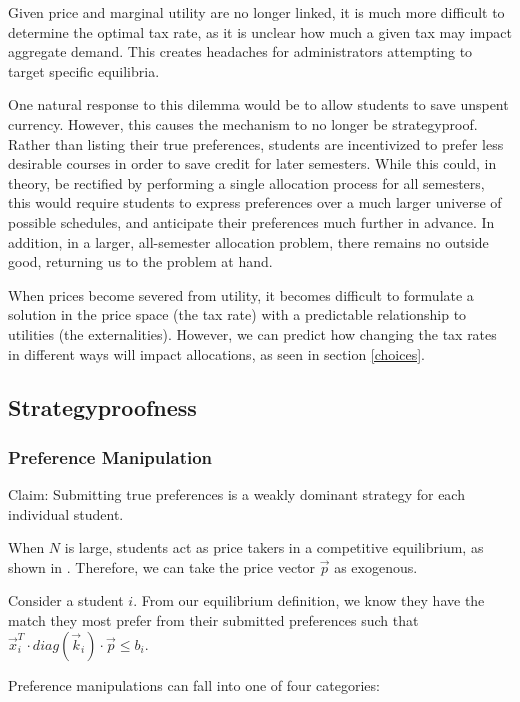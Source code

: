 \documentclass{article}
\begin{document}
Given price and marginal utility are no longer linked, it is much more difficult to determine the optimal tax rate, as it is unclear how much a given tax may impact aggregate demand. This creates headaches for administrators attempting to target specific equilibria. 

One natural response to this dilemma would be to allow students to save unspent currency. However, this causes the mechanism to no longer be strategyproof. Rather than listing their true preferences, students are incentivized to prefer less desirable courses in order to save credit for later semesters. While this could, in theory, be rectified by performing a single allocation process for all semesters, this would require students to express preferences over a much larger universe of possible schedules, and anticipate their preferences much further in advance. In addition, in a larger, all-semester allocation problem, there remains no outside good, returning us to the problem at hand.

When prices become severed from utility, it becomes difficult to formulate a solution in the price space (the tax rate) with a predictable relationship to utilities (the externalities). However, we can predict how changing the tax rates in different ways will impact allocations, as seen in section \ref{choices}.


\subsection{Strategyproofness}

\subsubsection{Preference Manipulation}
\label{strategyproofness}

Claim: Submitting true preferences is a weakly dominant strategy for each individual student.

When $N$ is large, students act as price takers in a competitive equilibrium, as shown in \textcite{budish2011}. Therefore, we can take the price vector $\vec{p}$ as exogenous. 

Consider a student $i$. From our equilibrium definition, we know they have the match they most prefer from their submitted preferences such that $\vec{x}_i^T \cdot diag(\vec{k}_i) \cdot \vec{p} \leq b_i$.

Preference manipulations can fall into one of four categories:
\end{document}
